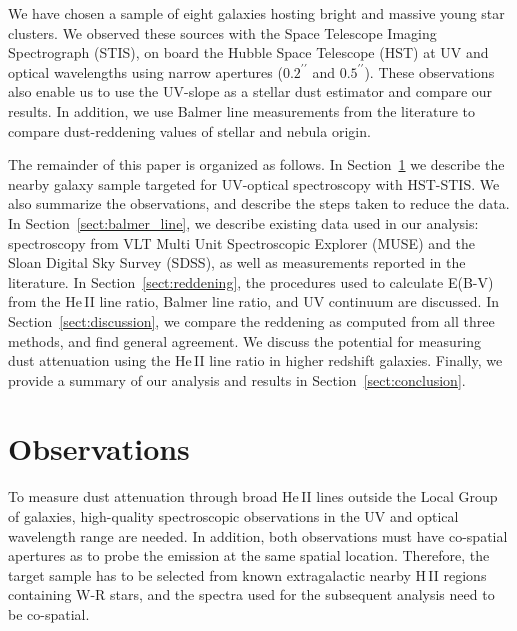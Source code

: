 \documentclass[]{aastex63}
\begin{document}
We have chosen a sample of eight galaxies hosting bright and massive young star clusters. 
We observed these sources with the Space Telescope Imaging Spectrograph (STIS), on board the Hubble Space Telescope (HST) at UV and optical wavelengths using narrow apertures ($0.2^{\prime\prime}$ and $0.5^{\prime\prime}$). 
These observations also enable us to use the UV-slope as a stellar dust estimator and compare our results. In addition, we use Balmer line measurements from the literature to compare dust-reddening values of stellar and nebula origin.

The remainder of this paper is organized as follows. In Section~\ref{sect:heii_obs} we describe the nearby galaxy sample targeted for UV-optical spectroscopy with HST-STIS.  We also summarize the observations, and describe the steps taken to reduce the data.  In Section~\ref{sect:balmer_line}, we describe existing data used in our analysis: spectroscopy from VLT Multi Unit Spectroscopic Explorer (MUSE) and the Sloan Digital Sky Survey (SDSS), as well as measurements reported in the literature.  In Section~\ref{sect:reddening}, the procedures used to calculate E(B-V) from the He\,II line ratio, Balmer line ratio, and UV continuum are discussed.  In Section~\ref{sect:discussion}, we compare the reddening as computed from all three methods, and find general agreement. We discuss the potential for measuring dust attenuation using the He\,II line ratio in higher redshift galaxies.  Finally, we provide a summary of our analysis and results in Section~\ref{sect:conclusion}.


\section{Observations}\label{sect:heii_obs}
To measure dust attenuation through broad He\,II lines outside the Local Group of galaxies, high-quality spectroscopic observations in the UV and optical wavelength range are needed. 
In addition, both observations must have co-spatial apertures as to probe the emission at the same spatial location.
Therefore, the target sample has to be selected from known extragalactic nearby H\,II regions containing W-R stars, and the spectra used for the subsequent analysis need to be co-spatial.
\end{document}
